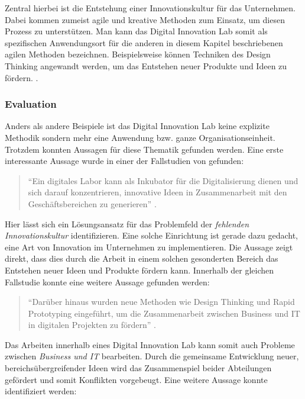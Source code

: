 Zentral hierbei ist die Entstehung einer Innovationskultur für das Unternehmen. Dabei kommen zumeist agile und kreative Methoden zum Einsatz, um diesen Prozess zu unterstützen. Man kann das Digital Innovation Lab somit als spezifischen Anwendungsort für die anderen in diesem Kapitel beschriebenen agilen Methoden bezeichnen. Beispielsweise  können Techniken des Design Thinking angewandt werden, um das Entstehen neuer Produkte und Ideen zu fördern. \cite{meyer_innovation_nodate}.


\subsubsection{Evaluation}

Anders als andere Beispiele ist das Digital Innovation Lab keine explizite Methodik sondern mehr eine Anwendung bzw. ganze Organisationseinheit. Trotzdem konnten Aussagen für diese Thematik gefunden werden. Eine erste interessante Aussage wurde in einer der Fallstudien von  gefunden:

\begin{quote}
	``Ein digitales Labor kann als Inkubator für die Digitalisierung dienen und sich darauf konzentrieren, innovative Ideen in Zusammenarbeit mit den Geschäftsbereichen zu generieren'' \cite[S. 266]{urbach_digitalization_2018}.
\end{quote}

Hier lässt sich ein Lösungsansatz für das Problemfeld der \textit{fehlenden Innovationskultur} identifizieren. Eine solche Einrichtung ist gerade dazu gedacht, eine Art von Innovation im Unternehmen zu  implementieren. Die Aussage zeigt direkt, dass dies durch die Arbeit in einem solchen gesonderten Bereich das Entstehen neuer Ideen und Produkte fördern kann. Innerhalb der gleichen Fallstudie konnte eine weitere Aussage gefunden werden:

\begin{quote}
	``Darüber hinaus wurden neue Methoden wie Design Thinking und Rapid Prototyping eingeführt, um die Zusammenarbeit zwischen Business und IT in digitalen Projekten zu fördern'' \cite[S. 261]{urbach_digitalization_2018}.
\end{quote}

Das Arbeiten innerhalb eines Digital Innovation Lab kann somit auch Probleme zwischen \textit{Business und IT} bearbeiten. Durch die gemeinsame Entwicklung neuer, bereichsübergreifender Ideen wird das Zusammenspiel beider Abteilungen gefördert und somit Konflikten vorgebeugt. Eine weitere Aussage konnte identifiziert werden:

